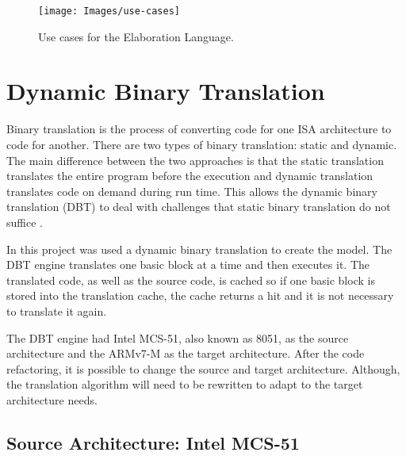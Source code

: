 \documentclass[11pt]{report}
\begin{document}
		\begin{figure} [H]
			\centering
			\texttt{[image: Images/use-cases]}
			\caption{Use cases for the Elaboration Language.}
			\label{fig:use-cases}
		\end{figure}
		
			
	\section{Dynamic Binary Translation}
	\par Binary translation is the process of converting code for one ISA architecture to code for another. There are two types of binary translation: static and dynamic. The main difference between the two approaches is that the static translation translates the entire program before the execution and dynamic translation translates code on demand during run time. This allows the dynamic binary translation (DBT) to deal with challenges that static binary translation do not suffice \cite{b.hawkingsb.demskyd.brueningq.zhao2015}. 
	\par In this project was used a dynamic binary translation to create the model. The DBT engine translates one basic block at a time and then executes it. The translated code, as well as the source code, is cached so if one basic block is stored into the translation cache, the cache returns a hit and it is not necessary to translate it again. 
	\par The DBT engine had Intel MCS-51, also known as 8051, as the source architecture and the ARMv7-M as the target architecture. After the code refactoring, it is possible to change the source and target architecture. Although, the translation algorithm will need to be rewritten to adapt to the target architecture needs.
	
		\subsection{Source Architecture: Intel MCS-51}
		
\end{document}
